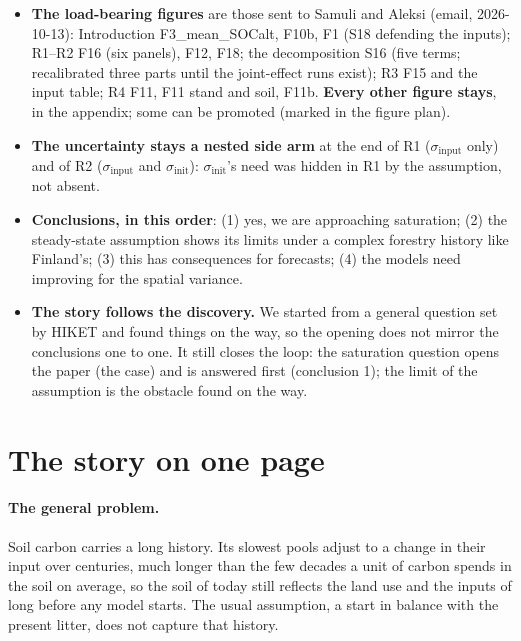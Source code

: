 \documentclass[11pt]{article}
\newcommand{\sinit}{\sigma_{\mathrm{init}}}
\newcommand{\sinput}{\sigma_{\mathrm{input}}}
\begin{document}
\begin{ann}
\begin{itemize}
    analysis of the implications: good trends, poor local skill; the residual analysis and its relationships;
    the hypotheses (understorey and pioneer vegetation missing), with literature mixed with our results; it
    ends with suggestions. The separate Discussion section is folded into it.
  \item \textbf{The load-bearing figures} are those sent to Samuli and Aleksi (email, 2026-10-13): Introduction
    F3\_mean\_SOCalt, F10b, F1 (S18 defending the inputs); R1--R2 F16 (six panels), F12, F18; the
    decomposition S16 (five terms; recalibrated three parts until the joint-effect runs exist); R3 F15 and the input table; R4 F11, F11 stand and soil, F11b.
    \textbf{Every other figure stays}, in the appendix; some can be promoted (marked in the figure plan).
  \item \textbf{The uncertainty stays a nested side arm} at the end of R1 ($\sinput$ only) and of R2 ($\sinput$
    and $\sinit$): $\sinit$'s need was hidden in R1 by the assumption, not absent.
  \item \textbf{Conclusions, in this order}: (1) yes, we are approaching saturation; (2) the steady-state
    assumption shows its limits under a complex forestry history like Finland's; (3) this has consequences
    for forecasts; (4) the models need improving for the spatial variance.
  \item \textbf{The story follows the discovery.} We started from a general question set by HIKET and found
    things on the way, so the opening does not mirror the conclusions one to one. It still closes the loop:
    the saturation question opens the paper (the case) and is answered first (conclusion 1); the limit of
    the assumption is the obstacle found on the way.
\end{itemize}
\end{ann}

\section*{The story on one page}

\paragraph{The general problem.} Soil carbon carries a long history. Its slowest pools adjust to a change in
their input over centuries, much longer than the few decades a unit of carbon spends in the soil on
average, so the soil of today still reflects the land use and the inputs of long before any model starts.
The usual assumption, a start in balance with the present litter, does not capture that history.
\end{document}
